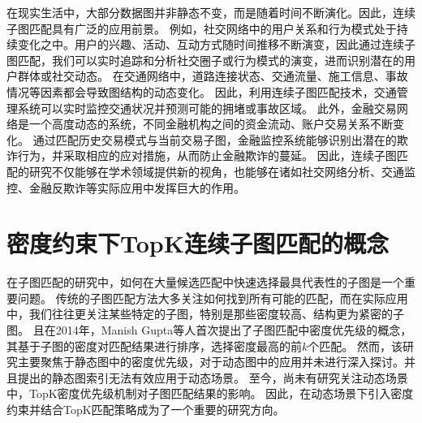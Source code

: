在现实生活中，大部分数据图并非静态不变，而是随着时间不断演化。因此，连续子图匹配具有广泛的应用前景。
例如，社交网络中的用户关系和行为模式处于持续变化之中。用户的兴趣、活动、互动方式随时间推移不断演变，因此通过连续子图匹配，我们可以实时追踪和分析社交圈子或行为模式的演变，进而识别潜在的用户群体或社交动态。
在交通网络中，道路连接状态、交通流量、施工信息、事故情况等因素都会导致图结构的动态变化。
因此，利用连续子图匹配技术，交通管理系统可以实时监控交通状况并预测可能的拥堵或事故区域。
此外，金融交易网络是一个高度动态的系统，不同金融机构之间的资金流动、账户交易关系不断变化。
通过匹配历史交易模式与当前交易子图，金融监控系统能够识别出潜在的欺诈行为，并采取相应的应对措施，从而防止金融欺诈的蔓延。
因此，连续子图匹配的研究不仅能够在学术领域提供新的视角，也能够在诸如社交网络分析、交通监控、金融反欺诈等实际应用中发挥巨大的作用。

\section{密度约束下TopK连续子图匹配的概念}
在子图匹配的研究中，如何在大量候选匹配中快速选择最具代表性的子图是一个重要问题。
传统的子图匹配方法大多关注如何找到所有可能的匹配，而在实际应用中，我们往往更关注某些特定的子图，特别是那些密度较高、结构更为紧密的子图。
且在2014年，Manish Gupta等人首次提出了子图匹配中密度优先级的概念\cite{static-topk-Gupta-DBLP:conf/icde/GuptaGYCH14}，其基于子图的密度对匹配结果进行排序，选择密度最高的前$k$个匹配。
然而，该研究主要聚焦于静态图中的密度优先级，对于动态图中的应用并未进行深入探讨。并且提出的静态图索引无法有效应用于动态场景。
至今，尚未有研究关注动态场景中，TopK密度优先级机制对子图匹配结果的影响。
因此，在动态场景下引入密度约束并结合TopK匹配策略成为了一个重要的研究方向。

